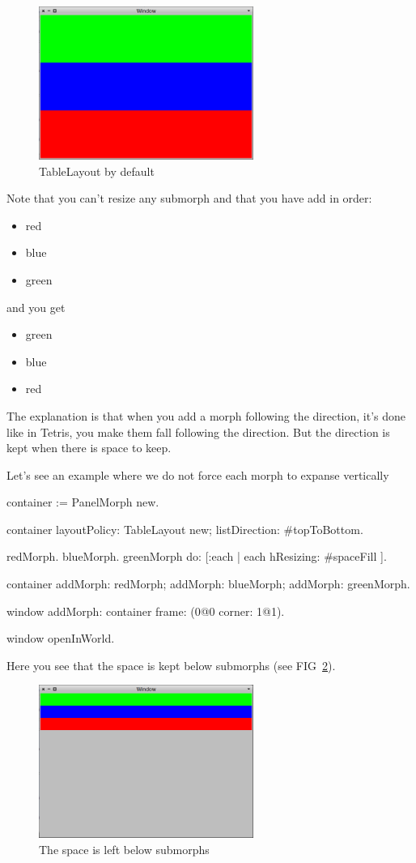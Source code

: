 \documentclass[a4paper,10pt,twoside]{book}
\begin{document}
\begin{figure}[ht]\centering
	\includegraphics[width=7cm]{TableLayout1}
	\caption{TableLayout by default}
	\label{fig:tableLayout1}
\end{figure}

Note that you can't resize any submorph and that you have add in order:
\begin{itemize}
	\item red
	\item blue
	\item green
\end{itemize}
and you get
\begin{itemize}
	\item green
	\item blue
	\item red
\end{itemize}

The explanation is that when you add a morph following the direction, it's done like in Tetris, you make them fall following the direction. But the direction is kept when there is space to keep.

Let's see an example where we do not force each morph to expanse vertically
\begin{code}{}
container := PanelMorph new.

container 
	layoutPolicy: TableLayout new;
	listDirection: #topToBottom.

{ redMorph. blueMorph. greenMorph } do: [:each |
	each 
		hResizing: #spaceFill ].
	
container 
	addMorph: redMorph;
	addMorph: blueMorph;
	addMorph: greenMorph.

window
	addMorph: container
	frame: (0@0 corner: 1@1).

window openInWorld.
\end{code}

Here you see that the space is kept below submorphs (see FIG~\ref{fig:tableLayout2}).

\begin{figure}[ht]\centering
	\includegraphics[width=7cm]{TableLayout2}
	\caption{The space is left below submorphs}
	\label{fig:tableLayout2}
\end{figure}
\end{document}
